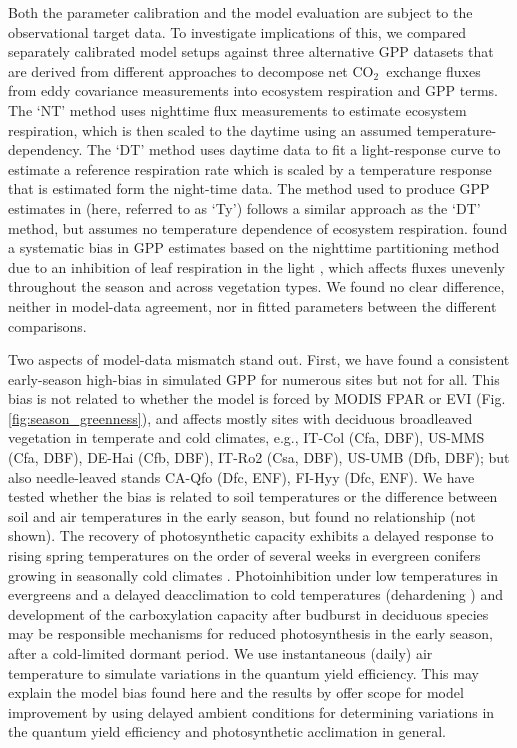 \documentclass{myreport}
\newcommand{\coo}{CO$_2$}
\begin{document}
Both the parameter calibration and the model evaluation are subject to the observational target data. To investigate implications of this, we compared separately calibrated model setups against three alternative GPP datasets that are derived from different approaches to decompose net \coo\ exchange fluxes from eddy covariance measurements into ecosystem respiration and GPP terms. The `NT' method \citep{Reichstein2005-mp} uses nighttime flux measurements to estimate ecosystem respiration, which is then scaled to the daytime using an assumed temperature-dependency. The `DT' method \citep{lasslop10} uses daytime data to fit a light-response curve to estimate a reference respiration rate which is scaled by a temperature response that is estimated form the night-time data. The method used to produce GPP estimates in \cite{wang17rs} (here, referred to as `Ty') follows a similar approach as the `DT' method, but assumes no temperature dependence of ecosystem respiration. \cite{keenan19natee} found a systematic bias in GPP estimates based on the nighttime partitioning method due to an inhibition of leaf respiration in the light \citep{kok49, wehr16}, which affects fluxes unevenly throughout the season and across vegetation types. We found no clear difference, neither in model-data agreement, nor in fitted parameters between the different comparisons.

Two aspects of model-data mismatch stand out. First, we have found a consistent early-season high-bias in simulated GPP for numerous sites but not for all. This bias is not related to whether the model is forced by MODIS FPAR or EVI (Fig. \ref{fig:season_greenness}), and affects mostly sites with deciduous broadleaved vegetation in temperate and cold climates, e.g., IT-Col (Cfa, DBF), US-MMS (Cfa, DBF), DE-Hai (Cfb, DBF), IT-Ro2 (Csa, DBF), US-UMB (Dfb, DBF); but also needle-leaved stands CA-Qfo (Dfc, ENF), FI-Hyy (Dfc, ENF). We have tested whether the bias is related to soil temperatures or the difference between soil and air temperatures in the early season, but found no relationship (not shown). The recovery of photosynthetic capacity exhibits a delayed response to rising spring temperatures on the order of several weeks in evergreen conifers growing in seasonally cold climates
\citep{pelkonen80, bergh98, makela04}. Photoinhibition under low temperatures in evergreens \citep{huner93} and a delayed deacclimation to cold temperatures (dehardening \citep{vitasse14}) and development of the carboxylation capacity after budburst in deciduous species may be responsible mechanisms for reduced photosynthesis in the early season, after a cold-limited dormant period. We use instantaneous (daily) air temperature to simulate variations in the quantum yield efficiency. This may explain the model bias found here and the results by \cite{makela04} offer scope for model improvement by using delayed ambient conditions for determining variations in the quantum yield efficiency and photosynthetic acclimation in general.
\end{document}

